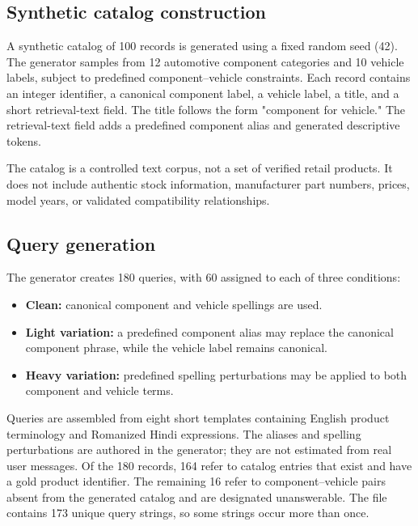 \documentclass[11pt,a4paper]{article}
\begin{document}
\subsection{Synthetic catalog construction}
A synthetic catalog of 100 records is generated using a fixed random seed (42). The generator samples from 12 automotive component categories and 10 vehicle labels, subject to predefined component--vehicle constraints. Each record contains an integer identifier, a canonical component label, a vehicle label, a title, and a short retrieval-text field. The title follows the form "component for vehicle." The retrieval-text field adds a predefined component alias and generated descriptive tokens.

The catalog is a controlled text corpus, not a set of verified retail products. It does not include authentic stock information, manufacturer part numbers, prices, model years, or validated compatibility relationships.

\subsection{Query generation}
The generator creates 180 queries, with 60 assigned to each of three conditions:
\begin{itemize}
  \item \textbf{Clean:} canonical component and vehicle spellings are used.
  \item \textbf{Light variation:} a predefined component alias may replace the canonical component phrase, while the vehicle label remains canonical.
  \item \textbf{Heavy variation:} predefined spelling perturbations may be applied to both component and vehicle terms.
\end{itemize}
Queries are assembled from eight short templates containing English product terminology and Romanized Hindi expressions. The aliases and spelling perturbations are authored in the generator; they are not estimated from real user messages. Of the 180 records, 164 refer to catalog entries that exist and have a gold product identifier. The remaining 16 refer to component--vehicle pairs absent from the generated catalog and are designated unanswerable. The file contains 173 unique query strings, so some strings occur more than once.
\end{document}
